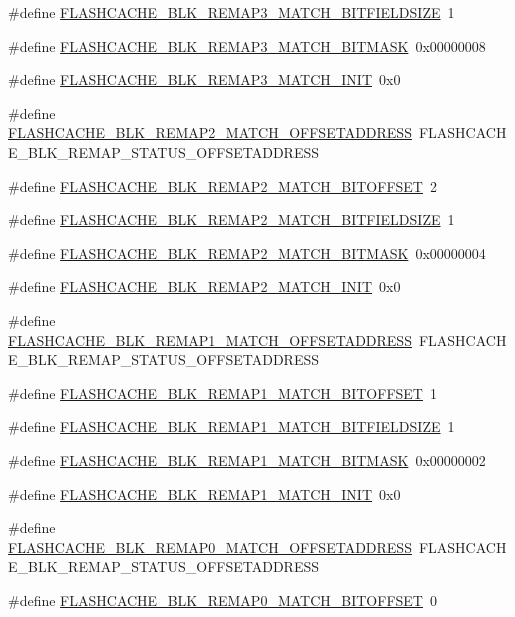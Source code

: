 \begin{DoxyCompactItemize}
\#define \hyperlink{a00550_a39ae0796270d4a6d5179eff1754fea4e}{FLASHCACHE\_\-BLK\_\-REMAP3\_\-MATCH\_\-BITFIELDSIZE}~1
\item 
\#define \hyperlink{a00550_addb9cb53877f6b8654d3375628748dcd}{FLASHCACHE\_\-BLK\_\-REMAP3\_\-MATCH\_\-BITMASK}~0x00000008
\item 
\#define \hyperlink{a00550_a2c3af32548c84be57e0a0bc37993702a}{FLASHCACHE\_\-BLK\_\-REMAP3\_\-MATCH\_\-INIT}~0x0
\item 
\#define \hyperlink{a00550_a4f17a12c60a6e3696e36b0843e6e0777}{FLASHCACHE\_\-BLK\_\-REMAP2\_\-MATCH\_\-OFFSETADDRESS}~FLASHCACHE\_\-BLK\_\-REMAP\_\-STATUS\_\-OFFSETADDRESS
\item 
\#define \hyperlink{a00550_abc271b2fc8ac022a146dcb2142d00eee}{FLASHCACHE\_\-BLK\_\-REMAP2\_\-MATCH\_\-BITOFFSET}~2
\item 
\#define \hyperlink{a00550_aaf684dce0e65a94d1eb1ec53c17b727b}{FLASHCACHE\_\-BLK\_\-REMAP2\_\-MATCH\_\-BITFIELDSIZE}~1
\item 
\#define \hyperlink{a00550_a0f881f08871e1b7e51d1149c98d25732}{FLASHCACHE\_\-BLK\_\-REMAP2\_\-MATCH\_\-BITMASK}~0x00000004
\item 
\#define \hyperlink{a00550_af0226d3910508bb12f27eae40ebaa7e0}{FLASHCACHE\_\-BLK\_\-REMAP2\_\-MATCH\_\-INIT}~0x0
\item 
\#define \hyperlink{a00550_a835aab6db8cc9d89aa3b5b54117b4ddb}{FLASHCACHE\_\-BLK\_\-REMAP1\_\-MATCH\_\-OFFSETADDRESS}~FLASHCACHE\_\-BLK\_\-REMAP\_\-STATUS\_\-OFFSETADDRESS
\item 
\#define \hyperlink{a00550_a3a6c92d48426be5bbd549fa53bb8fdc3}{FLASHCACHE\_\-BLK\_\-REMAP1\_\-MATCH\_\-BITOFFSET}~1
\item 
\#define \hyperlink{a00550_a90419f35254ab8e50dc29a3797c47410}{FLASHCACHE\_\-BLK\_\-REMAP1\_\-MATCH\_\-BITFIELDSIZE}~1
\item 
\#define \hyperlink{a00550_a4c57a502dc8a2a4e416d777c48fb7792}{FLASHCACHE\_\-BLK\_\-REMAP1\_\-MATCH\_\-BITMASK}~0x00000002
\item 
\#define \hyperlink{a00550_aaeb094531dc1c69e3f9b54869bbb588a}{FLASHCACHE\_\-BLK\_\-REMAP1\_\-MATCH\_\-INIT}~0x0
\item 
\#define \hyperlink{a00550_a912f9680dc45c8b793bcccaa5c35e6f2}{FLASHCACHE\_\-BLK\_\-REMAP0\_\-MATCH\_\-OFFSETADDRESS}~FLASHCACHE\_\-BLK\_\-REMAP\_\-STATUS\_\-OFFSETADDRESS
\item 
\#define \hyperlink{a00550_a06b6790cf51d824ae7bad77e6ed5c447}{FLASHCACHE\_\-BLK\_\-REMAP0\_\-MATCH\_\-BITOFFSET}~0
\item 

\end{DoxyCompactItemize}
